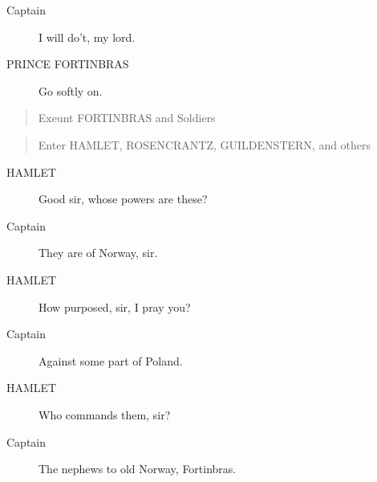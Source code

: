 \documentclass{article}
\begin{document}
\begin{description}
            
\item[Captain] I will do't, my lord.
\end{description}
          
\begin{description}
            
\item[PRINCE FORTINBRAS] Go softly on.
\end{description}
          
\begin{quote}
Exeunt FORTINBRAS and Soldiers
\end{quote}
          
\begin{quote}
Enter HAMLET, ROSENCRANTZ, GUILDENSTERN, and others
\end{quote}
          
\begin{description}
            
\item[HAMLET] Good sir, whose powers are these?
\end{description}
          
\begin{description}
            
\item[Captain] They are of Norway, sir.
\end{description}
          
\begin{description}
            
\item[HAMLET] How purposed, sir, I pray you?
\end{description}
          
\begin{description}
            
\item[Captain] Against some part of Poland.
\end{description}
          
\begin{description}
            
\item[HAMLET] Who commands them, sir?
\end{description}
          
\begin{description}
            
\item[Captain] The nephews to old Norway, Fortinbras.
\end{description}
          
\end{document}
